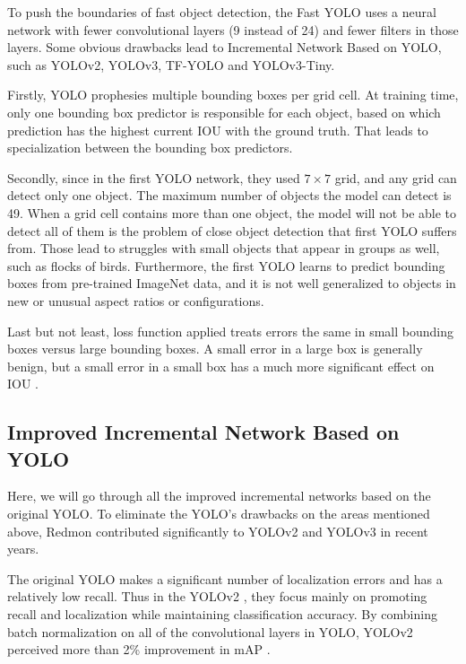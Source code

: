 
To push the boundaries of fast object detection, the  Fast YOLO \cite{yolov1} uses a neural network with fewer convolutional layers (9 instead of 24) and fewer filters in those layers. Some obvious drawbacks lead to Incremental Network Based on YOLO\cite{yolov1}, such as YOLOv2\cite{yolov2}, YOLOv3\cite{33}, TF-YOLO and YOLOv3-Tiny\cite{18}.

Firstly, YOLO\cite{yolov1} prophesies multiple bounding boxes per grid cell. At training time, only one bounding box predictor is responsible for each object, based on which prediction has the highest current IOU with the ground truth. That leads to specialization between the bounding box predictors.

Secondly, since in the first YOLO network, they used $7\times7$ grid, and any grid can detect only one object\cite{yolov1}. The maximum number of objects the model can detect is 49. When a grid cell contains more than one object, the model will not be able to detect all of them is the problem of close object detection that first YOLO suffers from. Those lead to struggles with small objects that appear in groups as well, such as flocks of birds\cite{yolov1}. Furthermore, the first YOLO  learns to predict bounding boxes from pre-trained ImageNet data, and it is not well generalized to objects in new or unusual aspect ratios or configurations\cite{18}. 

Last but not least, loss function applied treats errors the same in small bounding boxes versus large bounding boxes\cite{yolov1}. A small error in a large box is generally benign, but a small error in a small box has a much more significant effect on IOU \cite{yolov1}.



\subsection{ Improved Incremental Network Based on YOLO }


Here, we will go through all the improved incremental networks based on the original YOLO. To eliminate the YOLO's drawbacks on the areas mentioned above, Redmon contributed significantly to YOLOv2 \cite{ yolov2} and YOLOv3 \cite{33} in recent years. 

The original YOLO makes a signiﬁcant number of localization errors and has a relatively low recall. Thus in the YOLOv2 \cite{ yolov2}, they focus mainly on promoting recall and localization while maintaining classiﬁcation accuracy. By combining batch normalization on all of the convolutional layers in YOLO,  YOLOv2 perceived more than 2\% improvement in mAP \cite{ yolov2}.

